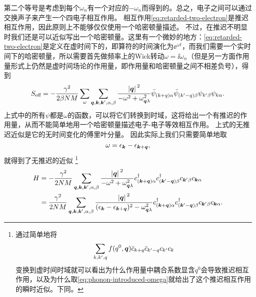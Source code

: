 第二个等号是考虑到每个$\omega_n$有一个对应的$-\omega_n$而得到的。总之，电子之间可以通过交换声子来产生一个四电子相互作用。
相互作用\eqref{eq:retarded-two-electron}是推迟相互作用，因此原则上不能够仅仅使用一个哈密顿量描述。
不过，在推迟不明显时我们还是可以近似写出一个哈密顿量。这里有一个微妙的地方：\eqref{eq:retarded-two-electron}是定义在虚时间下的，即算符的时间演化为$\ee^{\omega t}$，而我们需要一个实时间下的哈密顿量，所以需要首先做频率上的Wick转动$\omega = \ii \omega_n$（但是另一方面作用量形式上仍然是虚时间场论的作用量，即作用量和哈密顿量之间不相差负号），得到
\[
    S_\text{eff} = - \frac{\gamma^2}{2 \beta N M} \sum_{\omega} \sum_{\vb*{q}, \vb*{k}, \vb*{k}', \alpha, \beta} \frac{\abs*{\vb*{q}}^2}{- \omega^2 + \omega_{\vb*{q} \lambda}^2} \bar{\psi}_{({k}+{q}) \alpha} \bar{\psi}_{({k}' - {q}) \beta} \psi_{{k}' \beta} \psi_{{k} \alpha}.
\]
上式中的所有$\psi$都是$\omega$的函数，可以将它们转换到时域，这将给出一个有推迟的作用量，从而不能简单地用一个哈密顿量描述电子-电子等效相互作用。
上式的无推迟近似是它的无时间变化的傅里叶分量。
因此实际上我们只需要简单地取
\begin{equation}
    \omega = \epsilon_{\vb*{k}} - \epsilon_{\vb*{k} + \vb*{q}},
    \label{eq:phonon-introduced-omega}
\end{equation}
就得到了无推迟的近似%
\footnote{
    通过简单地将
    \[
        \sum_{k, k', q} f(q^0, \vb*{q}) \bar{c}_{k+q} \bar{c}_{k'-q} c_{k'} c_k
    \]
    变换到虚时间时域就可以看出为什么作用量中耦合系数显含$q^0$会导致推迟相互作用，以及为什么取\eqref{eq:phonon-introduced-omega}就给出了这个推迟相互作用的瞬时近似。下同。
}%
\begin{equation}
    \begin{aligned}
        {H} &= - \frac{\gamma^2}{2 N M} \sum_{\vb*{q}, \vb*{k}, \vb*{k}', \alpha, \beta} \frac{\abs*{\vb*{q}}^2}{- \omega^2 + \omega_{\vb*{q} \lambda}^2} {c}^\dagger_{(\vb*{k}+\vb*{q}) \alpha} {c}^\dagger_{(\vb*{k}' - \vb*{q}) \beta} {c}_{\vb*{k}' \beta} {c}_{\vb*{k} \alpha} \\
        &= \frac{\gamma^2}{2 N M} \sum_{\vb*{q}, \vb*{k}, \vb*{k}', \alpha, \beta} \frac{\abs*{\vb*{q}}^2}{(\epsilon_{\vb*{k}} - \epsilon_{\vb*{k}+\vb*{q}})^2 - \omega_{\vb*{q} \lambda}^2} {c}^\dagger_{(\vb*{k}+\vb*{q}) \alpha} {c}^\dagger_{(\vb*{k}' - \vb*{q}) \beta} {c}_{\vb*{k}' \beta} {c}_{\vb*{k} \alpha}.
    \end{aligned}
\end{equation}

